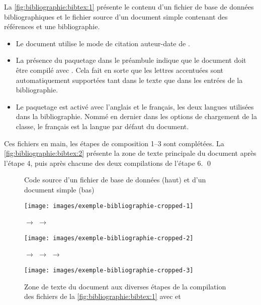 \begin{exemple}
  La \autoref{fig:bibliographie:bibtex:1} présente le contenu d'un
  fichier de base de données bibliographiques et le fichier source
  d'un document simple contenant des références et une bibliographie.

  \begin{itemize}
  \item Le document utilise le mode de citation auteur-date de
    .
  \item La présence du paquetage  dans le préambule
    indique que le document doit être compilé avec {\XeLaTeX}. Cela
    fait en sorte que les lettres accentuées sont automatiquement
    supportées tant dans le texte que dans les entrées de la
    bibliographie.
  \item Le paquetage  est activé avec l'anglais et le
    français, les deux langues utilisées dans la bibliographie. Nommé
    en dernier dans les options de chargement de la classe, le
    français est la langue par défaut du document.
  \end{itemize}

  Ces fichiers en main, les étapes de composition 1--3 sont
  complétées. La \autoref{fig:bibliographie:bibtex:2} présente la zone
  de texte principale du document après l'étape 4, puis après chacune
  des deux compilations de l'étape 6. %
  \qed
  \begin{figure}
    \centering
    
    \medskip
    
    \caption[Code source d'un fichier de base de données et
    d'un document simple]{%
      Code source d'un fichier de base de données (haut) et
      d'un document simple (bas)}
    \label{fig:bibliographie:bibtex:1}
  \end{figure}
  \begin{figure}
    \begin{framed}
      \texttt{[image: images/exemple-bibliographie-cropped-1]}
    \end{framed}
     $\rightarrow$  $\rightarrow$ 
    \begin{framed}
      \texttt{[image: images/exemple-bibliographie-cropped-2]}
    \end{framed}
     $\rightarrow$  $\rightarrow$  $\rightarrow$ 
    \begin{framed}
      \texttt{[image: images/exemple-bibliographie-cropped-3]}
    \end{framed}
    \caption{Zone de texte du document aux diverses étapes de la
      compilation des fichiers de la
      \autoref{fig:bibliographie:bibtex:1} avec {\XeLaTeX} et
      {\BibTeX}}
    \label{fig:bibliographie:bibtex:2}
  \end{figure}
\end{exemple}


